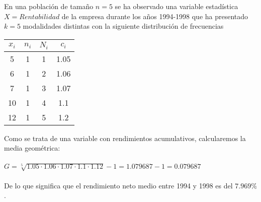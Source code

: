 En una población de tamaño $n = 5$ se ha observado una variable estadística $ X = Rentabilidad $  de la empresa durante los años 1994-1998 que ha presentado $k = 5$ modalidades distintas con la siguiente distribución de frecuencias
\\

	\begin{center}
		\begin{tabular}{| c | c | c | c | }
			\hline
			
			$x_{i}$ & $n_{i}$ & $N_{i}$ & $c_{i}$ \\ \hline
			5 & 1  & 1 & 1.05 \\
			6 & 1 & 2 & 1.06 \\
			7 & 1 & 3 & 1.07 \\
			10 & 1 & 4 & 1.1 \\
			12 & 1 & 5 & 1.2 \\ \hline
		\end{tabular}
		
	\end{center}
Como se trata de una variable con rendimientos acumulativos, calcularemos la media geométrica:
\\
\\
$ G = \sqrt[5]{1.05 \cdot 1.06 \cdot 1.07 \cdot 1.1 \cdot 1.12} - 1 = 1.079687 - 1 = 0.079687 $
\\
\\
De lo que significa que el rendimiento neto medio entre 1994 y 1998 es del $7.969\%$.
